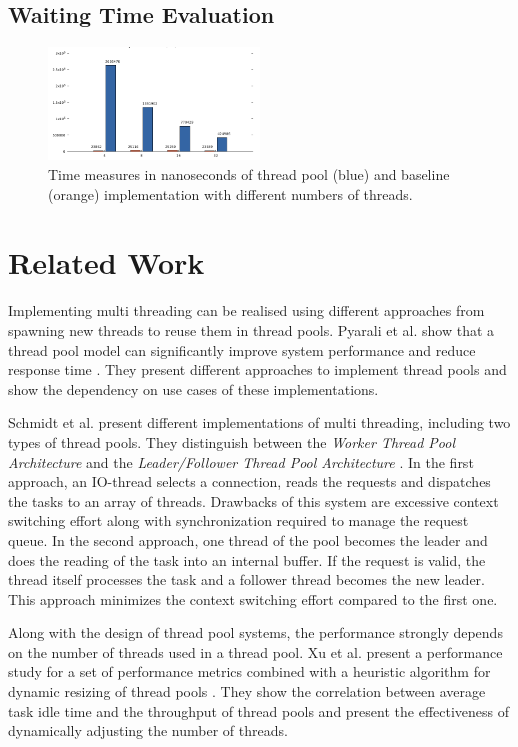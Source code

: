 \documentclass[conference]{IEEEtran}
\begin{document}
\subsection{Waiting Time Evaluation}
\begin{figure}
	\includegraphics[width=0.5\textwidth]{img/pool_avg.png}
	\caption{Time measures in nanoseconds of thread pool (blue) and baseline (orange) implementation with different numbers of threads.  }
	\label{fig7}
\end{figure}

\section{Related Work}
Implementing multi threading can be realised using different approaches from spawning new threads to reuse them in thread pools. Pyarali et al. show that a thread pool model can significantly improve system performance and reduce response time \cite{pyarali2001evaluating}. They present different approaches to implement thread pools and show the dependency on use cases of these implementations.

Schmidt et al. present different implementations of multi threading, including two types of thread pools. They distinguish between the \emph{Worker Thread Pool Architecture} and the \emph{Leader/Follower Thread Pool Architecture} \cite{schmidt1998evaluating}. In the first approach, an IO-thread selects a connection, reads the requests and dispatches the tasks to an array of threads. Drawbacks of this system are excessive context switching effort along with synchronization required to manage the request queue. In the second approach, one thread of the pool becomes the leader and does the reading of the task into an internal buffer. If the request is valid, the thread itself processes the task and a follower thread becomes the new leader. This approach minimizes the context switching effort compared to the first one.

Along with the design of thread pool systems, the performance strongly depends on the number of threads used in a thread pool. Xu et al. present a performance study for a set of performance metrics combined with a heuristic algorithm for dynamic resizing of thread pools \cite{xu2004performance}. They show the correlation between average task idle time and the throughput of thread pools and present the effectiveness of dynamically adjusting the number of threads.
\end{document}
